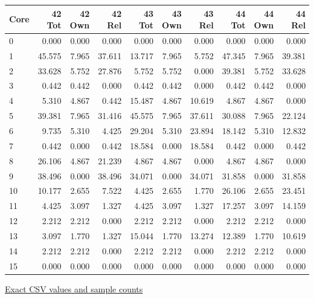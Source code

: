 \begin{center}{\scriptsize\setlength{\tabcolsep}{3pt}
\begin{tabular}{lrrrrrrrrr}
\toprule
Core & 42 Tot & 42 Own & 42 Rel & 43 Tot & 43 Own & 43 Rel & 44 Tot & 44 Own & 44 Rel \\
\midrule
0 & 0.000 & 0.000 & 0.000 & 0.000 & 0.000 & 0.000 & 0.000 & 0.000 & 0.000 \\
1 & 45.575 & 7.965 & 37.611 & 13.717 & 7.965 & 5.752 & 47.345 & 7.965 & 39.381 \\
2 & 33.628 & 5.752 & 27.876 & 5.752 & 5.752 & 0.000 & 39.381 & 5.752 & 33.628 \\
3 & 0.442 & 0.442 & 0.000 & 0.442 & 0.442 & 0.000 & 0.442 & 0.442 & 0.000 \\
4 & 5.310 & 4.867 & 0.442 & 15.487 & 4.867 & 10.619 & 4.867 & 4.867 & 0.000 \\
5 & 39.381 & 7.965 & 31.416 & 45.575 & 7.965 & 37.611 & 30.088 & 7.965 & 22.124 \\
6 & 9.735 & 5.310 & 4.425 & 29.204 & 5.310 & 23.894 & 18.142 & 5.310 & 12.832 \\
7 & 0.442 & 0.000 & 0.442 & 18.584 & 0.000 & 18.584 & 0.442 & 0.000 & 0.442 \\
8 & 26.106 & 4.867 & 21.239 & 4.867 & 4.867 & 0.000 & 4.867 & 4.867 & 0.000 \\
9 & 38.496 & 0.000 & 38.496 & 34.071 & 0.000 & 34.071 & 31.858 & 0.000 & 31.858 \\
10 & 10.177 & 2.655 & 7.522 & 4.425 & 2.655 & 1.770 & 26.106 & 2.655 & 23.451 \\
11 & 4.425 & 3.097 & 1.327 & 4.425 & 3.097 & 1.327 & 17.257 & 3.097 & 14.159 \\
12 & 2.212 & 2.212 & 0.000 & 2.212 & 2.212 & 0.000 & 2.212 & 2.212 & 0.000 \\
13 & 3.097 & 1.770 & 1.327 & 15.044 & 1.770 & 13.274 & 12.389 & 1.770 & 10.619 \\
14 & 2.212 & 2.212 & 0.000 & 2.212 & 2.212 & 0.000 & 2.212 & 2.212 & 0.000 \\
15 & 0.000 & 0.000 & 0.000 & 0.000 & 0.000 & 0.000 & 0.000 & 0.000 & 0.000 \\
\bottomrule\end{tabular}}
{\footnotesize\href{https://github.com/sanjeevkrishnaa/Compiler-Driven-ACE/blob/codex/ace-scheduler-correctness/docs/latex/qft96_final/data/heatmap_mesh_shortest_reliable_route_m3.csv}{Exact CSV values and sample counts}}
\end{center}
